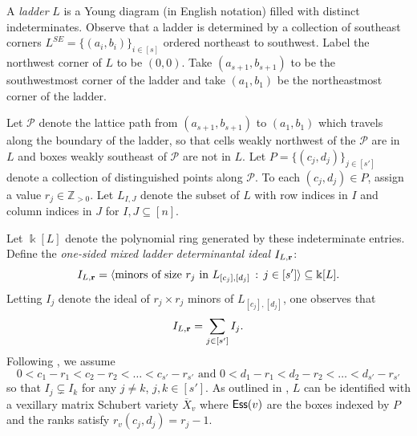 \documentclass[12pt]{amsart}
\theoremstyle{definition}
\theoremstyle{remark}
\numberwithin{equation}{section}
\newcommand{\Ess}{{\sf Ess}}
\begin{document}
A \emph{ladder} $L$ is a Young diagram (in English notation) filled with distinct indeterminates. Observe that a ladder is determined by a collection of southeast corners $L^{SE} = \{(a_i,b_i)\}_{i\in [s]}$ ordered northeast to southwest. Label the northwest corner of $L$ to be $(0,0)$. Take $(a_{s+1},b_{s+1})$ to be the southwestmost corner of the ladder and take $(a_1,b_1)$ be the northeastmost corner of the ladder. 


Let $\mathcal{P}$ denote the lattice path from $(a_{s+1},b_{s+1})$ to $(a_1,b_1)$ which travels along the boundary of the ladder, so that cells weakly northwest of the $\mathcal{P}$ are in $L$ and boxes weakly southeast of $\mathcal{P}$ are not in $L$. 
Let $P = \{(c_j,d_j)\}_{j\in[s']}$ denote a collection of distinguished points along $\mathcal{P}$. To each $(c_j,d_j)\in P$, assign a value $r_j\in \mathbb{Z}_{> 0}$. Let $L_{I,J}$ denote the subset of $L$ with row indices in $I$ and column indices in $J$ for $I,J\subseteq[n]$. 

Let $\Bbbk[L]$ denote the polynomial ring generated by these indeterminate entries. 
Define the \emph{one-sided mixed ladder determinantal ideal} $I_{L,{\bf{r}}}$:
\[I_{L,{\bf{r}}} = \langle \text{minors of size } r_j \text{ in } L_{[c_j],[d_j]}\,:  \, j\in[s']\rangle\subseteq \Bbbk[L].\] 
Letting $I_j$ denote the ideal of $r_j\times r_j$ minors of $L_{[c_j],[d_j]}$, one observes that
\[
I_{L,{\bf r}} = \sum_{j\in[s']} I_j.
\]
Following \cite{KM}, we assume 
\begin{equation}\label{eq:laddRed}
    0<c_1-r_1<c_2-r_2<\dots<c_{s'}-r_{s'} \text{ and } 0<d_1-r_1<d_2-r_2<\dots<d_{s'}-r_{s'}
\end{equation}
 so that 
$I_j\subsetneq I_k$ for any $j\neq k$, $j,k\in [s']$. 
As outlined in \cite[Proposition 9.6]{Fulton.Flags}, $L$ can be identified with a vexillary matrix Schubert variety $\overline{X}_v$ where $\Ess{(v)}$ are the boxes indexed by $P$ and the ranks satisfy $r_v(c_j,d_j)=r_j-1$.
\end{document}
